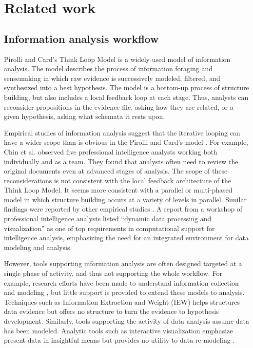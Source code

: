 \section{Related work}\label{related-work}

\subsection{Information analysis workflow}

Pirolli and Card's Think Loop Model \cite{Pirolli2005} is a widely used model of information analysis. The model describes the process of information foraging and sensemaking in which raw evidence is successively modeled, filtered, and synthesized into a best hypothesis. The model is a bottom-up process of structure building, but also includes a local feedback loop at each stage. Thus, analysts can reconsider propositions in the evidence file, asking how they are related, or a given hypothesis, asking what schemata it rests upon.

Empirical studies of information analysis suggest that the iterative looping can
have a wider scope than is obvious in the Pirolli and Card's model
\cite{Pirolli2005}. For example, Chin et al. \cite{Chin2009} observed five
professional intelligence analysts working both individually and as a team. They
found that analysts often need to review the original documents even at advanced
stages of analysis. The scope of these reconsiderations is not consistent with
the local feedback architecture of the Think Loop Model. It seems more
consistent with a parallel or multi-phased model \cite{Wheaton2011} in which
structure building occurs at a variety of levels in parallel. Similar findings
were reported by other empirical studies
\cite{Isenberg2008b,Kang2011,Herrmann2013a}. A report \cite{Badalamente2005}
from a workshop of professional intelligence analysts listed ``dynamic data
processing and visualization'' as one of top requirements in computational
support for intelligence analysis, emphasizing the need for an integrated
environment for data modeling and analysis.

However, tools supporting information analysis are often designed targeted at a single phase of activity, and thus not supporting the whole workflow. For example, research efforts have been made to understand information collection and modeling \cite{Shah2014i, Jansen2010c}, but little support is provided to extend these models to analysis. Techniques such as Information Extraction and Weight (IEW) helps structures data evidence but offers no structure to turn the evidence to hypothesis development. Similarly, tools supporting the activity of data analysis assume data has been modeled. Analytic tools such as interactive visualization emphasize present data in insightful means but provides no utility to data re-modeling \cite{Ware2012}.

